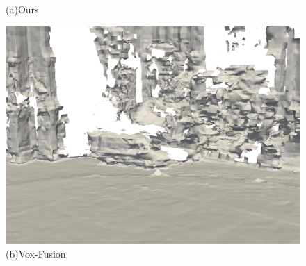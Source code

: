 \begin{figure}[htbp]
\begin{minipage}{0.5\linewidth}
    \caption*{(a)Ours}
\end{minipage}\hfill
\begin{minipage}{0.5\linewidth}
    \centering
    \includegraphics[width=1\linewidth]{figures/ncd_1_bce.png}
    \caption*{(b)Vox-Fusion}
\end{minipage}
\end{figure}


